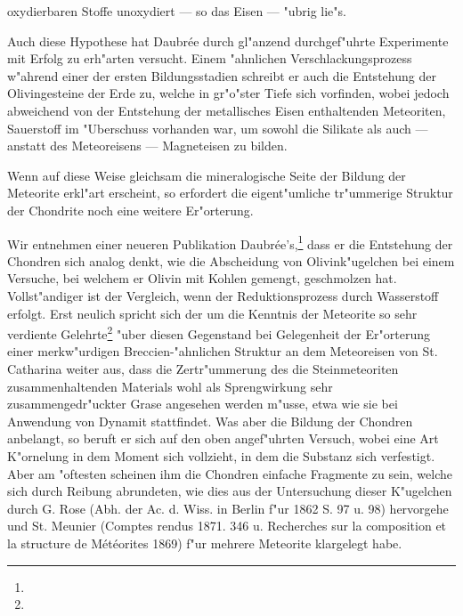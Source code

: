 \documentclass[a4paper, 11pt, oneside]{article}
\begin{document}
oxydierbaren Stoffe unoxydiert --- so das Eisen --- "ubrig lie"s.

Auch diese Hypothese hat Daubrée durch gl"anzend durchgef"uhrte Experimente mit Erfolg zu erh"arten versucht. Einem "ahnlichen Verschlackungsprozess w"ahrend einer der ersten Bildungsstadien schreibt er auch die Entstehung der Olivingesteine der Erde zu, welche in gr"o"ster Tiefe sich vorfinden, wobei jedoch abweichend von der Entstehung der metallisches Eisen enthaltenden Meteoriten, Sauerstoff im "Uberschuss vorhanden war, um sowohl die Silikate als auch --- anstatt des Meteoreisens --- Magneteisen zu bilden.

Wenn auf diese Weise gleichsam die mineralogische Seite der Bildung der Meteorite erkl"art erscheint, so erfordert die eigent"umliche tr"ummerige Struktur der Chondrite noch eine weitere Er"orterung.

Wir entnehmen einer neueren Publikation Daubrée's,\footnote{} dass er die Entstehung der Chondren sich analog denkt, wie die Abscheidung von Olivink"ugelchen bei einem Versuche, bei welchem er Olivin mit Kohlen gemengt, geschmolzen hat. Vollst"andiger ist der Vergleich, wenn der Reduktionsprozess durch Wasserstoff erfolgt. Erst neulich spricht sich der um die Kenntnis der Meteorite so sehr verdiente Gelehrte\footnote{} "uber diesen Gegenstand bei Gelegenheit der Er"orterung einer merkw"urdigen Breccien-"ahnlichen Struktur an dem Meteoreisen von St. Catharina weiter aus, dass die Zertr"ummerung des die Steinmeteoriten zusammenhaltenden Materials wohl als Sprengwirkung sehr zusammengedr"uckter Grase angesehen werden m"usse, etwa wie sie bei Anwendung von Dynamit stattfindet. Was aber die Bildung der Chondren anbelangt, so beruft er sich auf den oben angef"uhrten Versuch, wobei eine Art K"ornelung in dem Moment sich vollzieht, in dem die Substanz sich verfestigt. Aber am "oftesten scheinen ihm die Chondren einfache Fragmente zu sein, welche sich durch Reibung abrundeten, wie dies aus der Untersuchung dieser K"ugelchen durch G. Rose (Abh. der Ac. d. Wiss. in Berlin f"ur 1862 S. 97 u. 98) hervorgehe und St. Meunier (Comptes rendus 1871. 346 u. Recherches sur la composition et la structure de Météorites 1869) f"ur mehrere Meteorite klargelegt habe.
\end{document}
